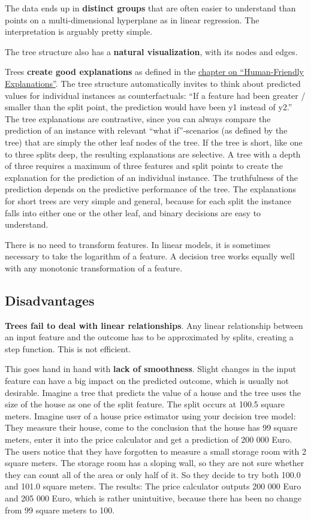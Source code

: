 \documentclass[
  10pt,
]{scrbook}
\begin{document}
The data ends up in \textbf{distinct groups} that are often easier to understand than points on a multi-dimensional hyperplane as in linear regression.
The interpretation is arguably pretty simple.

The tree structure also has a \textbf{natural visualization}, with its nodes and edges.

Trees \textbf{create good explanations} as defined in the \protect\hyperlink{good-explanation}{chapter on ``Human-Friendly Explanations''}.
The tree structure automatically invites to think about predicted values for individual instances as counterfactuals:
``If a feature had been greater / smaller than the split point, the prediction would have been y1 instead of y2.''
The tree explanations are contrastive, since you can always compare the prediction of an instance with relevant ``what if''-scenarios (as defined by the tree) that are simply the other leaf nodes of the tree.
If the tree is short, like one to three splits deep, the resulting explanations are selective.
A tree with a depth of three requires a maximum of three features and split points to create the explanation for the prediction of an individual instance.
The truthfulness of the prediction depends on the predictive performance of the tree.
The explanations for short trees are very simple and general, because for each split the instance falls into either one or the other leaf, and binary decisions are easy to understand.

There is no need to transform features.
In linear models, it is sometimes necessary to take the logarithm of a feature.
A decision tree works equally well with any monotonic transformation of a feature.

\hypertarget{disadvantages-2}{%
\subsection{Disadvantages}\label{disadvantages-2}}

\textbf{Trees fail to deal with linear relationships}.
Any linear relationship between an input feature and the outcome has to be approximated by splits, creating a step function.
This is not efficient.

This goes hand in hand with \textbf{lack of smoothness}.
Slight changes in the input feature can have a big impact on the predicted outcome, which is usually not desirable.
Imagine a tree that predicts the value of a house and the tree uses the size of the house as one of the split feature.
The split occurs at 100.5 square meters.
Imagine user of a house price estimator using your decision tree model:
They measure their house, come to the conclusion that the house has 99 square meters, enter it into the price calculator and get a prediction of 200 000 Euro.
The users notice that they have forgotten to measure a small storage room with 2 square meters.
The storage room has a sloping wall, so they are not sure whether they can count all of the area or only half of it.
So they decide to try both 100.0 and 101.0 square meters.
The results: The price calculator outputs 200 000 Euro and 205 000 Euro, which is rather unintuitive, because there has been no change from 99 square meters to 100.
\end{document}
